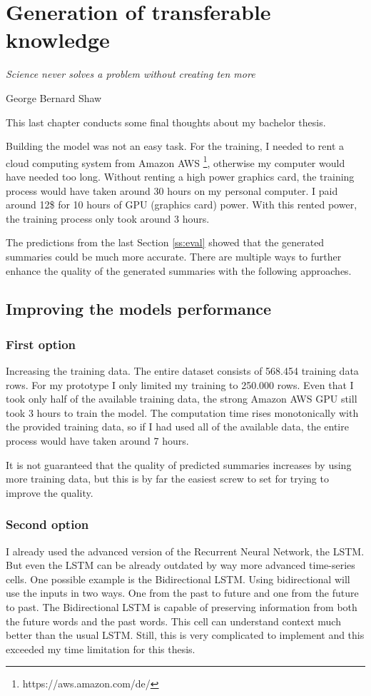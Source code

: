 \chapter{Generation of transferable knowledge}\label{ch:knowledge}

\epigraph{\textit{Science never solves a problem without creating ten more}}{George Bernard Shaw}

This last chapter conducts some final thoughts about my bachelor thesis.

Building the model was not an easy task. For the training, I needed to rent a cloud computing system from Amazon AWS \footnote{https://aws.amazon.com/de/}, otherwise my computer would have needed too long. Without renting a high power graphics card, the training process would have taken around 30 hours on my personal computer. I paid around 12\$ for 10 hours of GPU (graphics card) power. With this rented power, the training process only took around 3 hours. 

The predictions from the last Section \ref{ss:eval} showed that the generated summaries could be much more accurate. There are multiple ways to further enhance the quality of the generated summaries with the following approaches. 

\section{Improving the models performance} 

\subsection{First option}
Increasing the training data. The entire dataset consists of 568.454 training data rows. For my prototype I only limited my training to 250.000 rows. Even that I took only half of the available training data, the strong Amazon AWS GPU still took 3 hours to train the model. The computation time rises monotonically with the provided training data, so if I had used all of the available data, the entire process would have taken around 7 hours. 

It is not guaranteed that the quality of predicted summaries increases by using more training data, but this is by far the easiest screw to set for trying to improve the quality.

\subsection{Second option}
I already used the advanced version of the Recurrent Neural Network, the LSTM. But even the LSTM can be already outdated by way more advanced time-series cells. One possible example is the Bidirectional LSTM. Using bidirectional will use the inputs in two ways. One from the past to future and one from the future to past. The Bidirectional LSTM is capable of preserving information from both the future words and the past words. This cell can understand context much better than the usual LSTM. Still, this is very complicated to implement and this exceeded my time limitation for this thesis.

